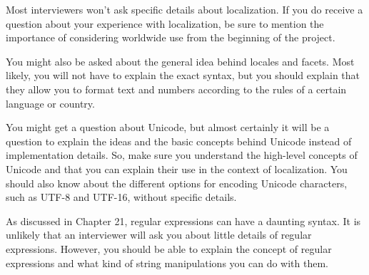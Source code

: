 Most interviewers won’t ask specific details about localization. If you do receive a question about your experience with localization, be sure to mention the importance of considering worldwide use from the beginning of the project.

You might also be asked about the general idea behind locales and facets. Most likely, you will not have to explain the exact syntax, but you should explain that they allow you to format text and numbers according to the rules of a certain language or country.

You might get a question about Unicode, but almost certainly it will be a question to explain the ideas and the basic concepts behind Unicode instead of implementation details. So, make sure you understand the high-level concepts of Unicode and that you can explain their use in the context of localization. You should also know about the different options for encoding Unicode characters, such as UTF-8 and UTF-16, without specific details.

As discussed in Chapter 21, regular expressions can have a daunting syntax. It is unlikely that an interviewer will ask you about little details of regular expressions. However, you should be able to explain the concept of regular expressions and what kind of string manipulations you can do with them.





